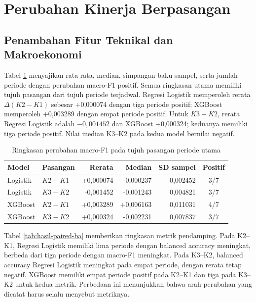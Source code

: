 \section{Perubahan Kinerja Berpasangan}

\subsection{Penambahan Fitur Teknikal dan Makroekonomi}

Tabel \ref{tab:hasil-paired-f1} menyajikan rata-rata, median, simpangan baku sampel, serta jumlah periode dengan perubahan macro-F1 positif. Semua ringkasan utama memiliki tujuh pasangan dari tujuh periode terjadwal. Regresi Logistik memperoleh rerata $\Delta(K2-K1)$ sebesar +0,000074 dengan tiga periode positif; XGBoost memperoleh +0,003289 dengan empat periode positif. Untuk $K3-K2$, rerata Regresi Logistik adalah $-0{,}001452$ dan XGBoost +0,000324; keduanya memiliki tiga periode positif. Nilai median K3--K2 pada kedua model bernilai negatif.


\begin{table}[htbp]
\centering
\small
\setlength{\tabcolsep}{4pt}
\caption{Ringkasan perubahan macro-F1 pada tujuh pasangan periode utama}
\label{tab:hasil-paired-f1}
\begin{tabular}{llrrrc}
\toprule
Model & Pasangan & Rerata & Median & SD sampel & Positif \\
\midrule
Logistik & $K2-K1$ & +0,000074 & -0,000237 & 0,002452 & 3/7 \\
Logistik & $K3-K2$ & -0,001452 & -0,001243 & 0,004821 & 3/7 \\
XGBoost & $K2-K1$ & +0,003289 & +0,006163 & 0,011031 & 4/7 \\
XGBoost & $K3-K2$ & +0,000324 & -0,002231 & 0,007837 & 3/7 \\
\bottomrule
\end{tabular}
\end{table}


Tabel \ref{tab:hasil-paired-ba} memberikan ringkasan metrik pendamping. Pada K2--K1, Regresi Logistik memiliki lima periode dengan balanced accuracy meningkat, berbeda dari tiga periode dengan macro-F1 meningkat. Pada K3--K2, balanced accuracy Regresi Logistik meningkat pada empat periode, dengan rerata tetap negatif. XGBoost memiliki empat periode positif pada K2--K1 dan tiga pada K3--K2 untuk kedua metrik. Perbedaan ini menunjukkan bahwa arah perubahan yang dicatat harus selalu menyebut metriknya.


